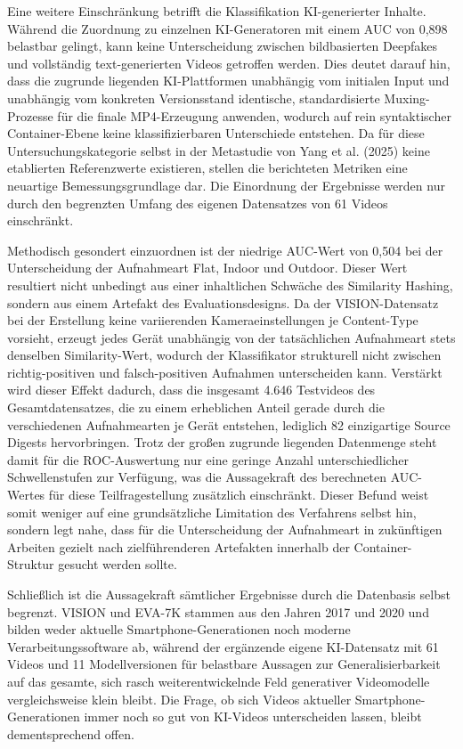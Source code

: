 Eine weitere Einschränkung betrifft die Klassifikation KI-generierter Inhalte. Während die Zuordnung zu einzelnen KI-Generatoren mit einem AUC von 0,898 belastbar gelingt, kann keine Unterscheidung zwischen bildbasierten Deepfakes und vollständig text-generierten Videos getroffen werden. Dies deutet darauf hin, dass die zugrunde liegenden KI-Plattformen unabhängig vom initialen Input und unabhängig vom konkreten Versionsstand identische, standardisierte Muxing-Prozesse für die finale MP4-Erzeugung anwenden, wodurch auf rein syntaktischer Container-Ebene keine klassifizierbaren Unterschiede entstehen. Da für diese Untersuchungskategorie selbst in der Metastudie von Yang et al. (2025)\cite{yang_comprehensive_2025} keine etablierten Referenzwerte existieren, stellen die berichteten Metriken eine neuartige Bemessungsgrundlage dar. Die Einordnung der Ergebnisse werden nur durch den begrenzten Umfang des eigenen Datensatzes von 61 Videos einschränkt.

Methodisch gesondert einzuordnen ist der niedrige AUC-Wert von 0,504 bei der Unterscheidung der Aufnahmeart Flat, Indoor und Outdoor. Dieser Wert resultiert nicht unbedingt aus einer inhaltlichen Schwäche des Similarity Hashing, sondern aus einem Artefakt des Evaluationsdesigns. Da der VISION-Datensatz bei der Erstellung keine variierenden Kameraeinstellungen je Content-Type vorsieht, erzeugt jedes Gerät unabhängig von der tatsächlichen Aufnahmeart stets denselben Similarity-Wert, wodurch der Klassifikator strukturell nicht zwischen richtig-positiven und falsch-positiven Aufnahmen unterscheiden kann. Verstärkt wird dieser Effekt dadurch, dass die insgesamt 4.646 Testvideos des Gesamtdatensatzes, die zu einem erheblichen Anteil gerade durch die verschiedenen Aufnahmearten je Gerät entstehen, lediglich 82 einzigartige Source Digests hervorbringen. Trotz der großen zugrunde liegenden Datenmenge steht damit für die ROC-Auswertung nur eine geringe Anzahl unterschiedlicher Schwellenstufen zur Verfügung, was die Aussagekraft des berechneten AUC-Wertes für diese Teilfragestellung zusätzlich einschränkt. Dieser Befund weist somit weniger auf eine grundsätzliche Limitation des Verfahrens selbst hin, sondern legt nahe, dass für die Unterscheidung der Aufnahmeart in zukünftigen Arbeiten gezielt nach zielführenderen Artefakten innerhalb der Container-Struktur gesucht werden sollte.

Schließlich ist die Aussagekraft sämtlicher Ergebnisse durch die Datenbasis selbst begrenzt. VISION und EVA-7K stammen aus den Jahren 2017 und 2020 und bilden weder aktuelle Smartphone-Generationen noch moderne Verarbeitungssoftware ab, während der ergänzende eigene KI-Datensatz mit 61 Videos und 11 Modellversionen für belastbare Aussagen zur Generalisierbarkeit auf das gesamte, sich rasch weiterentwickelnde Feld generativer Videomodelle vergleichsweise klein bleibt. Die Frage, ob sich Videos aktueller Smartphone-Generationen immer noch so gut von KI-Videos unterscheiden lassen, bleibt dementsprechend offen.